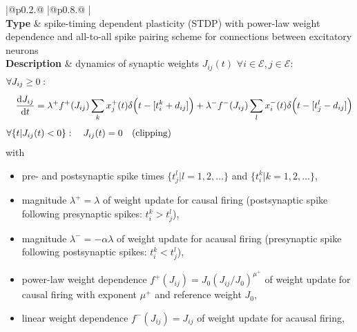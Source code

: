 \documentclass[10pt,a4paper,twoside,american]{article}
\newcommand{\diff}{\ensuremath{\text{d}}}
\newcommand{\Epop}{\mathcal{E}} %
\begin{document}
\addtocounter{table}{-1}
\begin{table}[H]
\begin{tabular}{
  |@{\hspace*{\marg}}p{}@{\hspace*{\marg}}
  |@{\hspace*{\marg}}p{}@{\hspace*{\marg}}
  |}
  \hline 
  \\
\hline 
\textbf{Type} & spike-timing dependent plasticity (STDP) with power-law weight dependence and all-to-all spike pairing scheme \citep{Morrison07_1437} for connections between excitatory neurons\\
\hline 
  \textbf{Description} &
   dynamics of synaptic weights $J_{ij}(t)$ $\forall{}i\in\Epop, j\in\Epop$:                         
   \begin{equation*}
     \begin{aligned}
       &\forall J_{ij}\ge{}0: \\[1ex]
       &\quad
       \frac{\diff{}J_{ij}}{\diff{}t}=
       \lambda^+f^+(J_{ij})\sum_k x^+_j(t)\delta\Bigl(t-[t_i^k+d_{ij}]\Bigr)
       + \lambda^-f^-(J_{ij})\sum_l x^-_i(t)\delta\Big(t-[t_j^l-d_{ij}]\Bigr)\\[1ex]
       &\forall{}\{t|J_{ij}(t)<0\}: \quad J_{ij}(t)=0  \quad \text{(clipping)}
     \end{aligned}
   \end{equation*}
    with
   \begin{itemize}
    \item pre- and postsynaptic spike times $\{t_j^l|l=1,2,\ldots\}$ and $\{t_i^k|k=1,2,\ldots\}$,
    \item magnitude $\lambda^+=\lambda$ of weight update for causal firing (postsynaptic spike following presynaptic spikes: $t_i^k>t_j^l$),
    \item  magnitude $\lambda^-=-\alpha\lambda$ of weight update for acausal firing (presynaptic spike following postsynaptic spikes: $t_i^k<t_j^l$),
    \item power-law weight dependence $f^+(J_{ij})=J_0(J_{ij}/J_0)^{\mu^+}$ of weight update for causal firing with exponent $\mu^+$ and reference weight $J_0$,
    \item linear weight dependence $f^-(J_{ij})=J_{ij}$ of weight update for acausal firing,

\end{itemize}
\end{tabular}
\end{table}
\end{document}
